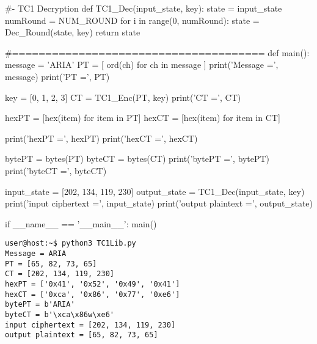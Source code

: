 \begin{python}[TC1Lib.py]
#- TC1 Decryption
def TC1_Dec(input_state, key):
   state = input_state
   numRound = NUM_ROUND
   for i in range(0, numRound):
      state = Dec_Round(state, key)
   return state
   
#======================================
def main():
   message = 'ARIA'
   PT = [ ord(ch) for ch in message ]
   print('Message =', message)
   print('PT =', PT)
   
   key = [0, 1, 2, 3]
   CT = TC1_Enc(PT, key)
   print('CT =', CT)
   
   hexPT = [hex(item) for item in PT]
   hexCT = [hex(item) for item in CT]
   
   print('hexPT =', hexPT)
   print('hexCT =', hexCT)
   
   bytePT = bytes(PT)
   byteCT = bytes(CT)
   print('bytePT =', bytePT)
   print('byteCT =', byteCT)

   input_state = [202, 134, 119, 230]
   output_state = TC1_Dec(input_state, key)
   print('input ciphertext =', input_state)
   print('output plaintext =', output_state)

if __name__ == '__main__':
   main()
\end{python}

{\begin{lstlisting}[style=terminal]
user@host:~$ python3 TC1Lib.py                            
Message = ARIA
PT = [65, 82, 73, 65]
CT = [202, 134, 119, 230]
hexPT = ['0x41', '0x52', '0x49', '0x41']
hexCT = ['0xca', '0x86', '0x77', '0xe6']
bytePT = b'ARIA'
byteCT = b'\xca\x86w\xe6'
input ciphertext = [202, 134, 119, 230]
output plaintext = [65, 82, 73, 65]
\end{lstlisting}}

\newpage
